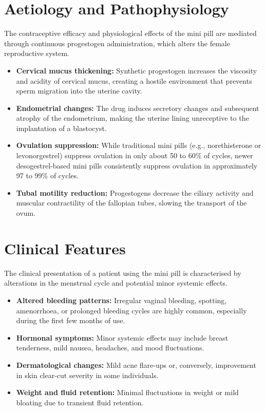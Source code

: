 \section*{Aetiology and Pathophysiology}
The contraceptive efficacy and physiological effects of the mini pill are mediated through continuous progestogen administration, which alters the female reproductive system.
\begin{itemize}
    \item \textbf{Cervical mucus thickening:} Synthetic progestogen increases the viscosity and acidity of cervical mucus, creating a hostile environment that prevents sperm migration into the uterine cavity.
    \item \textbf{Endometrial changes:} The drug induces secretory changes and subsequent atrophy of the endometrium, making the uterine lining unreceptive to the implantation of a blastocyst.
    \item \textbf{Ovulation suppression:} While traditional mini pills (e.g., norethisterone or levonorgestrel) suppress ovulation in only about 50 to 60\% of cycles, newer desogestrel-based mini pills consistently suppress ovulation in approximately 97 to 99\% of cycles.
    \item \textbf{Tubal motility reduction:} Progestogens decrease the ciliary activity and muscular contractility of the fallopian tubes, slowing the transport of the ovum.
\end{itemize}

\section*{Clinical Features}
The clinical presentation of a patient using the mini pill is characterised by alterations in the menstrual cycle and potential minor systemic effects.
\begin{itemize}
    \item \textbf{Altered bleeding patterns:} Irregular vaginal bleeding, spotting, amenorrhoea, or prolonged bleeding cycles are highly common, especially during the first few months of use.
    \item \textbf{Hormonal symptoms:} Minor systemic effects may include breast tenderness, mild nausea, headaches, and mood fluctuations.
    \item \textbf{Dermatological changes:} Mild acne flare-ups or, conversely, improvement in skin clear-cut severity in some individuals.
    \item \textbf{Weight and fluid retention:} Minimal fluctuations in weight or mild bloating due to transient fluid retention.
\end{itemize}

